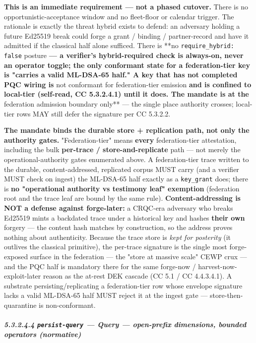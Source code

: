 \documentclass[11pt]{article}
\begin{document}
\textbf{This is an immediate requirement — not a phased cutover.} There is no opportunistic-acceptance window and no fleet-floor or calendar trigger. The rationale is exactly the threat hybrid exists to defend: an adversary holding a future Ed25519 break could forge a grant / binding / partner-record and have it admitted if the classical half alone sufficed. There is **no \texttt{require\_hybrid: false} posture\textbf{ — a verifier's hybrid-required check is always-on, never an operator toggle; the only conformant state for a federation-tier key is "carries a valid ML-DSA-65 half." A key that has not completed PQC wiring is }not conformant for federation-tier emission\textbf{ and is confined to local-tier (self-read, CC 5.3.2.4.1) until it does. The mandate is at the }federation admission boundary only** — the single place authority crosses; local-tier rows MAY still defer the signature per CC 5.3.2.2.


\textbf{The mandate binds the durable store + replication path, not only the authority gates.} "Federation-tier" means \textbf{every} federation-tier attestation, including the bulk \textbf{per-trace / store-and-replicate} path — not merely the operational-authority gates enumerated above. A federation-tier trace written to the durable, content-addressed, replicated corpus MUST carry (and a verifier MUST check on ingest) the ML-DSA-65 half exactly as a \texttt{key\_grant} does; there is \textbf{no "operational authority vs testimony leaf" exemption} (federation root and the trace leaf are bound by the same rule). \textbf{Content-addressing is NOT a defense against forge-later:} a CRQC-era adversary who breaks Ed25519 mints a backdated trace under a historical key and hashes \textbf{their own} forgery — the content hash matches by construction, so the address proves nothing about authenticity. Because the trace store is \textit{kept for posterity} (it outlives the classical primitive), the per-trace signature is the single most forge-exposed surface in the federation — the "store at massive scale" CEWP crux — and the PQC half is mandatory there for the same forge-now / harvest-now-exploit-later reason as the at-rest DEK cascade (CC 5.1 / CC 4.4.3.4.1). A substrate persisting/replicating a federation-tier row whose envelope signature lacks a valid ML-DSA-65 half MUST reject it at the ingest gate — store-then-quarantine is non-conformant.


\subparagraph{5.3.2.4.4 \texttt{persist-query} — Query — open-prefix dimensions, bounded operators (normative)}\mbox{}\\
\end{document}
